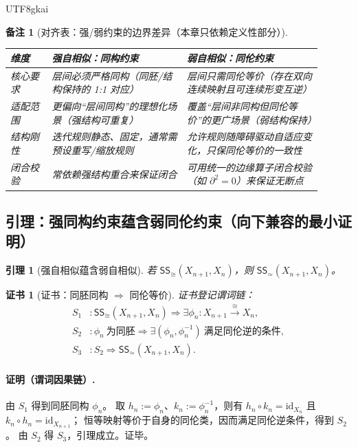 \documentclass[12pt]{article}
\newtheorem{lemma}{引理}[section]
\newtheorem{remark}{备注}[section]
\newtheorem{Certificate}{证书}[section]
\begin{document}
\begin{CJK*}{UTF8}{gkai}
\begin{remark}[对齐表：强/弱约束的边界差异（本章只依赖定义性部分）]
\begin{center}
\renewcommand{\arraystretch}{1.25}
\begin{tabular}{|p{0.12\linewidth}|p{0.39\linewidth}|p{0.39\linewidth}|}
\hline
\textbf{维度} & \textbf{强自相似：同构约束} & \textbf{弱自相似：同伦约束} \\
\hline
核心要求 &
层间必须严格同构（同胚/结构保持的 1:1 对应） &
层间只需同伦等价（存在双向连续映射且可连续形变互逆） \\
\hline
适配范围 &
更偏向“层间同构”的理想化场景（强结构可重复） &
覆盖“层间非同构但同伦等价”的更广场景（弱结构保持） \\
\hline
结构刚性 &
迭代规则静态、固定，通常需预设重写/缩放规则 &
允许规则随障碍驱动自适应变化，只保同伦等价的一致性 \\
\hline
闭合校验 &
常依赖强结构重合来保证闭合 &
可用统一的边缘算子闭合校验（如 $\partial^2=0$）来保证无断点 \\
\hline
\end{tabular}
\end{center}
\end{remark}

\subsection{引理：强同构约束蕴含弱同伦约束（向下兼容的最小证明）}
\label{subsec:tex29-strong-implies-weak}

\begin{lemma}[强自相似蕴含弱自相似]
\label{lem:tex29-ss-strong-implies-weak}
若 $\mathsf{SS}_{\cong}(X_{n+1},X_n)$，则 $\mathsf{SS}_{\simeq}(X_{n+1},X_n)$。
\end{lemma}

\begin{Certificate}[证书：同胚同构 $\Rightarrow$ 同伦等价]
\label{cert:tex29-ss-strong-implies-weak}
证书登记谓词链：
\[
\begin{aligned}
  S_1 &: \mathsf{SS}_{\cong}(X_{n+1},X_n)\Rightarrow \exists \phi_n:X_{n+1}\xrightarrow{\cong} X_n,\\
  S_2 &: \phi_n\ \text{为同胚}\Rightarrow \exists (\phi_n,\phi_n^{-1})\ \text{满足同伦逆的条件},\\
  S_3 &: S_2 \Rightarrow \mathsf{SS}_{\simeq}(X_{n+1},X_n).
\end{aligned}
\]
\end{Certificate}

\paragraph{证明（谓词因果链）.}
由 $S_1$ 得到同胚同构 $\phi_n$。
取 $h_n:=\phi_n$、$k_n:=\phi_n^{-1}$，则有 $h_n\circ k_n=\mathrm{id}_{X_n}$ 且 $k_n\circ h_n=\mathrm{id}_{X_{n+1}}$；
恒等映射等价于自身的同伦类，因而满足同伦逆条件，得到 $S_2$。
由 $S_2$ 得 $S_3$，引理成立。证毕。


\end{CJK*}
\end{document}
